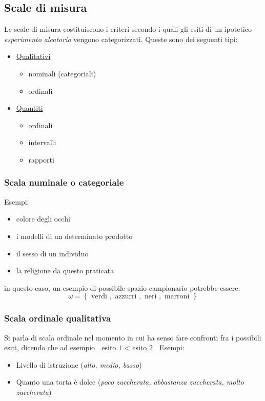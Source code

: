 \subsection{Scale di misura}
Le scale di misura costituiscono i criteri secondo i quali gli esiti di un ipotetico \textit{esperimento aleatorio} vengono categorizzati. Queste sono dei seguenti tipi:
\begin{itemize}
	\item \underline{Qualitativi}
	      \begin{itemize}
		      \item nominali (categoriali)
		      \item ordinali
	      \end{itemize}
	\item \underline{Quantiti}
	      \begin{itemize}
		      \item ordinali
		      \item intervalli
		      \item rapporti
	      \end{itemize}
\end{itemize}
\subsubsection*{Scala numinale o categoriale}
Esempi:
\begin{itemize}
	\item colore degli occhi
	\item i modelli di un determinato prodotto
	\item il sesso di un individuo
	\item la religione da questo praticata
\end{itemize}
in questo caso, un esempio di possibile spazio campionario potrebbe essere:
\[
	\omega  = \left\{\text{ verdi }, \text{ azzurri }, \text{ neri }, \text{ marroni }\right\}
\]
\subsubsection*{Scala ordinale qualitativa}
Si parla di scala ordinale nel momento in cui ha senso fare confronti fra i possibili esiti, dicendo che ad esempio $ \text{ esito 1 } < \text{ esito 2 } $
\vskip3mm
Esempi:
\begin{itemize}
	\item Livello di istruzione (\textit{alto, medio, basso})
	\item Quanto una torta è dolce (\textit{poco zuccherata, abbastanza zuccherata, molto zuccherata})
\end{itemize}

